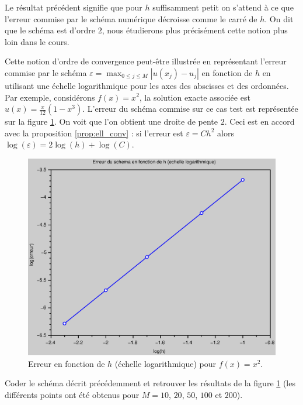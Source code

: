 \documentclass[12pt,a4paper,twoside]{article}
\begin{document}
Le r\'esultat pr\'ec\'edent signifie que pour $h$ suffisamment petit
on s'attend \`a ce que l'erreur commise par le sch\'ema num\'erique d\'ecroisse
comme le carr\'e de $h$.
On dit que le sch\'ema est d'ordre $2$, nous \'etudierons plus pr\'ecis\'ement cette notion
plus loin dans le cours.


Cette notion d'ordre de convergence peut-\^etre illustr\'ee en repr\'esentant 
l'erreur commise par le sch\'ema 
$\varepsilon = \max_{0\leq j \leq M} |u(x_j) - u_j|$ en fonction de $h$ 
en utilisant une \'echelle logarithmique
pour les axes des abscisses et des ordonn\'ees.
Par exemple, consid\'erons $f(x) = x^2$, la solution exacte associ\'ee
est $u(x) = \frac{x}{12}(1-x^3)$.
L'erreur du sch\'ema commise sur ce cas test est repr\'esent\'ee
sur la figure \ref{fig:ell_convergence}.
On voit que l'on obtient une droite de pente $2$.
Ceci est en accord avec la proposition \ref{prop:ell_conv} :
si l'erreur est $\varepsilon = C h^2$ alors
$\log(\varepsilon) = 2 \log(h) + \log(C)$.

\begin{figure}[h]
  \centering
  \includegraphics[width = 12cm]{Figures/Poisson_conv.eps}
  \caption{Erreur en fonction de $h$ (\'echelle logarithmique)
    pour $f(x) = x^2$.}
  \label{fig:ell_convergence}
\end{figure}


\begin{exercise}
  Coder le sch\'ema d\'ecrit pr\'ec\'edemment et retrouver les 
  r\'esultats de la figure \ref{fig:ell_convergence}
  (les diff\'erents points ont \'et\'e obtenus pour $M=10$, $20$,
  $50$, $100$ et $200$).
\end{exercise}
\end{document}
